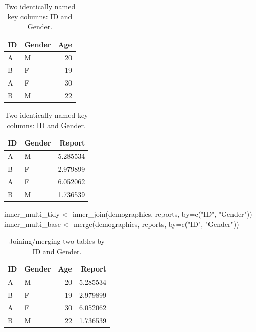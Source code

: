 \documentclass[
]{book}
\newenvironment{Shaded}{\begin{snugshade}}{\end{snugshade}}
\newcommand{\AttributeTok}[1]{\textcolor[rgb]{0.77,0.63,0.00}{#1}}
\newcommand{\FunctionTok}[1]{\textcolor[rgb]{0.00,0.00,0.00}{#1}}
\newcommand{\NormalTok}[1]{#1}
\newcommand{\OtherTok}[1]{\textcolor[rgb]{0.56,0.35,0.01}{#1}}
\newcommand{\StringTok}[1]{\textcolor[rgb]{0.31,0.60,0.02}{#1}}
\begin{document}
\begin{table}
\caption{\label{tab:unnamed-chunk-189}Two identically named key columns: ID and Gender.}

\centering
\begin{tabular}[t]{l|l|r}
\hline
ID & Gender & Age\\
\hline
A & M & 20\\
\hline
B & F & 19\\
\hline
A & F & 30\\
\hline
B & M & 22\\
\hline
\end{tabular}
\centering
\begin{tabular}[t]{l|l|r}
\hline
ID & Gender & Report\\
\hline
A & M & 5.285534\\
\hline
B & F & 2.979899\\
\hline
A & F & 6.052062\\
\hline
B & M & 1.736539\\
\hline
\end{tabular}
\end{table}

\begin{Shaded}
\begin{Highlighting}[]
\NormalTok{inner\_multi\_tidy }\OtherTok{\textless{}{-}} \FunctionTok{inner\_join}\NormalTok{(demographics, reports, }\AttributeTok{by=}\FunctionTok{c}\NormalTok{(}\StringTok{"ID"}\NormalTok{, }\StringTok{"Gender"}\NormalTok{))}
\NormalTok{inner\_multi\_base }\OtherTok{\textless{}{-}} \FunctionTok{merge}\NormalTok{(demographics, reports, }\AttributeTok{by=}\FunctionTok{c}\NormalTok{(}\StringTok{"ID"}\NormalTok{, }\StringTok{"Gender"}\NormalTok{))}
\end{Highlighting}
\end{Shaded}

\begin{table}

\caption{\label{tab:unnamed-chunk-191}Joining/merging two tables by ID and Gender.}
\centering
\begin{tabular}[t]{l|l|r|r}
\hline
ID & Gender & Age & Report\\
\hline
A & M & 20 & 5.285534\\
\hline
B & F & 19 & 2.979899\\
\hline
A & F & 30 & 6.052062\\
\hline
B & M & 22 & 1.736539\\
\hline
\end{tabular}
\end{table}
\end{document}
